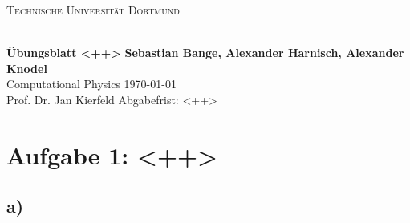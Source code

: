 \documentclass[a4paper, 11pt]{article}
\begin{document}
\noindent
\centerline{\small{\textsc{Technische Universität Dortmund}}} \\
\large\textbf{Übungsblatt <++>} \hfill \footnotesize\textbf{Sebastian Bange, Alexander Harnisch, Alexander Knodel} \\
\normalsize Computational Physics \hfill \today \\
Prof. Dr. Jan Kierfeld \hfill Abgabefrist: <++>\\
\noindent\makebox[\linewidth]{\rule{\textwidth}{0.4pt}}
\section*{Aufgabe 1: <++>}
\subsection*{a)}
\end{document}

